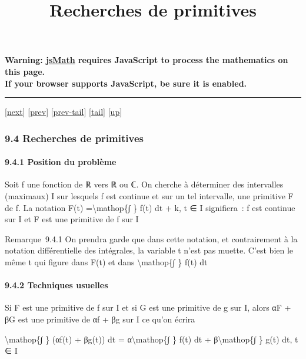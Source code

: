 \documentclass[]{article}
\title{Recherches de primitives}
\author{}
\date{}
\begin{document}
\maketitle

\textbf{Warning: \href{http://www.math.union.edu/locate/jsMath}{jsMath}
requires JavaScript to process the mathematics on this page.\\ If your
browser supports JavaScript, be sure it is enabled.}

\begin{center}\rule{3in}{0.4pt}\end{center}

{[}\href{coursse54.html}{next}{]} {[}\href{coursse52.html}{prev}{]}
{[}\href{coursse52.html\#tailcoursse52.html}{prev-tail}{]}
{[}\hyperref[tailcoursse53.html]{tail}{]}
{[}\href{coursch10.html\#coursse53.html}{up}{]}

\subsubsection{9.4 Recherches de primitives}

\paragraph{9.4.1 Position du problème}

Soit f une fonction de ℝ vers ℝ ou ℂ. On cherche à déterminer des
intervalles (maximaux) I sur lesquels f est continue et sur un tel
intervalle, une primitive F de f. La notation F(t)
=\textbackslash{}mathop\{∫ \} f(t) dt + k, t ∈ I signifiera~: f est
continue sur I et F est une primitive de f sur I

Remarque~9.4.1 On prendra garde que dans cette notation, et
contrairement à la notation différentielle des intégrales, la variable t
n'est pas muette. C'est bien le même t qui figure dans F(t) et dans
\textbackslash{}mathop\{∫ \} f(t) dt

\paragraph{9.4.2 Techniques usuelles}

Si F est une primitive de f sur I et si G est une primitive de g sur I,
alors αF + βG est une primitive de αf + βg sur I ce qu'on écrira

\textbackslash{}mathop\{∫ \} (αf(t) + βg(t)) dt =
α\textbackslash{}mathop\{∫ \} f(t) dt + β\textbackslash{}mathop\{∫ \}
g(t) dt, t ∈ I
\end{document}
